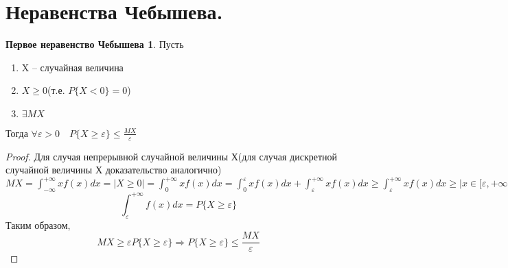 \documentclass[a4paper, 12pt]{article}
\theoremstyle{definition}
\theoremstyle{leads}
\theoremstyle{example}
\begin{document}
\section{Неравенства Чебышева.}
	\newtheorem*{cheb}{Первое неравенство Чебышева}
	\begin{cheb}
	 Пусть
	\begin{enumerate}
		\item X -- случайная величина
		\item $X\geq 0$(т.е. $P\{X < 0\} = 0$)
		\item $\exists MX$
	\end{enumerate}	
    Тогда $\forall \varepsilon > 0 \quad P\{X \geq \varepsilon \} \leq \frac{MX}{\varepsilon}$
	\end{cheb}
    \begin{proof}
    	Для случая непрерывной случайной величины Х(для случая дискретной случайной величины Х доказательство аналогично)\\
    	$MX = \int_{-\infty}^{+\infty} xf(x)dx = |X \geq 0| = \int_{0}^{+\infty} xf(x)dx = \int_{0}^{\varepsilon} xf(x)dx + \int_{\varepsilon}^{+\infty} xf(x)dx \geq
    	\int_{\varepsilon}^{+\infty}xf(x)dx \geq |x \in [\varepsilon, +\infty) \rightarrow x \geq \varepsilon| \geq \varepsilon \int_{\varepsilon}^{+\infty} f(x)dx \geq \varepsilon P\{ x\geq \varepsilon\}$
    	\begin{displaymath}
    	\int_{\varepsilon}^{+\infty} f(x)dx = P\{X \geq \varepsilon\}
    	\end{displaymath}
    	Таким образом, 
    	\begin{displaymath}
    	MX \geq \varepsilon P\{X \geq \varepsilon\} \Longrightarrow P\{X \geq \varepsilon\} \leq \frac{MX}{\varepsilon}
    	\end{displaymath}
    \end{proof}
\end{document}
